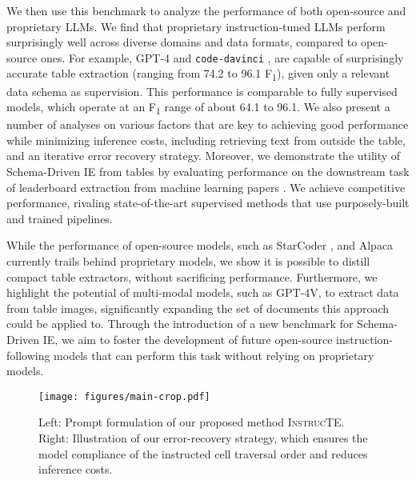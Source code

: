 \documentclass[11pt]{article}
\newcommand\method{\textsc{InstrucTE}}
\begin{document}
We then use this benchmark to analyze the performance of both open-source and proprietary LLMs. 
We find that proprietary instruction-tuned LLMs perform surprisingly well across diverse domains and data formats, compared to open-source ones. For example, GPT-4 \cite{gpt4} and {\tt code-davinci} \cite{codex}, are capable of surprisingly accurate table extraction (ranging from 74.2 to 96.1 F\textsubscript{1}), given only a relevant data schema as supervision. This performance is comparable to fully supervised models, which operate at an F\textsubscript{1} range of about 64.1 to 96.1. We also present a number of analyses on various factors that are key to achieving good performance while minimizing inference costs, including retrieving text from outside the table, and an iterative error recovery strategy.
Moreover, we demonstrate the utility of Schema-Driven IE from tables by evaluating performance on the downstream task of leaderboard extraction from machine learning papers \citep{kardas-etal-2020-axcell}. We achieve competitive performance, rivaling state-of-the-art supervised methods that use purposely-built and trained pipelines.









While the performance of open-source models, such as StarCoder \cite{starcoder}, and Alpaca currently trails behind proprietary models, we show it is possible to distill compact table extractors, without sacrificing performance. 
Furthermore, we highlight the potential of multi-modal models, such as GPT-4V, to extract data from table images, significantly expanding the set of documents this approach could be applied to.
Through the introduction of a new benchmark for Schema-Driven IE, we aim to foster the development of future open-source instruction-following models that can perform this task without relying on proprietary models.


\begin{figure*}[ht!]
    \centering
    \texttt{[image: figures/main-crop.pdf]}
    \caption{Left: Prompt formulation of our proposed method \method{}. Right: Illustration of our error-recovery strategy, which ensures the model compliance of the instructed cell traversal order and reduces inference costs.
}
    \label{fig:method}
\end{figure*}
\end{document}
